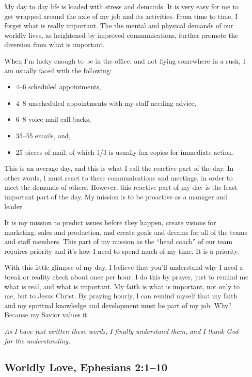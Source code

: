 \documentclass[12pt]{memoir}
\begin{document}
My day to day life is loaded with stress and demands. It is very easy for me to get wrapped around the axle of my job and its activities. From time to time, I forget what is really important. The the mental and physical demands of our worldly lives, as heightened by improved communications, further promote the diversion from what is important.

When I'm lucky enough to be in the office, and not flying somewhere in a rush, I am usually faced with the following: 
\begin{itemize}
\item 4--6 scheduled appointments,
\item 4--8 unscheduled appointments with my staff needing advice,
\item 6--8 voice mail call backs,
\item 35--55 emails, and,
\item 25 pieces of mail, of which 1/3 is usually fax copies for immediate action.

\end{itemize}
This is an average day, and this is what I call the reactive part of the day. In other words, I must react to these communications
and meetings, in order to meet the demands of others. However, this reactive
part of my day is the least important part of the day. My mission is to be proactive as a manager and leader. 

It is my mission to predict issues before they happen, create visions for marketing, sales and production, and create goals and dreams for all of the teams and staff members. This part of my mission as the ``head coach'' of our team requires priority and it's how I need to spend much of my time. It is a priority.

With this little glimpse of my day, I believe that you'll understand why I need a break or reality check about once per hour. I do this by prayer, just to remind me what is real, and what is important. My faith is what is important, not only to me, but to Jesus Christ. By praying hourly, I can remind myself that my faith and my spiritual knowledge and development must be part of my job. Why? Because my Savior values it. 

\begin{center}
\emph{As I have just written these words, I finally understand them, and I thank God for the understanding.}
\end{center}


\subsection[Worldly Love, Ephesians]{Worldly Love, Ephesians 2:1--10}
\end{document}
